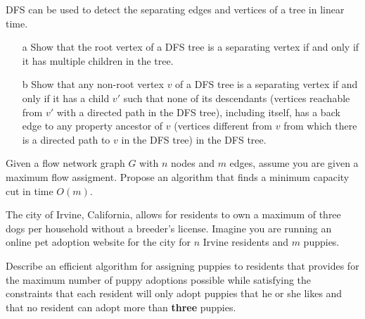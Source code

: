 \documentclass{common/cs157}
\begin{document}
\homeworkhandin

\begin{problem}{1}
DFS can be used to detect the separating edges and vertices of a tree in linear time.
\begin{itemize}
    \item[a] Show that the root vertex of a DFS tree is a separating vertex if and only if it has multiple children in the tree.
    \item[b] Show that any non-root vertex $v$ of a DFS tree is a separating vertex if and only if it has a child $v'$ such that none of its descendants (vertices reachable from $v'$ with a directed  path in the DFS tree), including itself, has a back edge to any property ancestor of $v$ (vertices different from $v$ from which there is a directed path to $v$ in the DFS tree) in the DFS tree.
\end{itemize}
\end{problem}
\newpage

\begin{problem}{2}
Given a flow network graph $G$ with $n$ nodes and $m$ edges, assume you are given a maximum flow assigment. Propose an algorithm that finds a minimum capacity cut in time $O(m)$.

\end{problem}
\newpage

\begin{problem}{3}
The city of Irvine, California, allows for residents to own a maximum of three
dogs per household without a breeder’s license. Imagine you are running an
online pet adoption website for the city for $n$ Irvine residents and $m$ puppies. 

Describe an efficient algorithm for assigning puppies to residents that provides for the maximum number of puppy adoptions possible while satisfying the constraints that each resident will only adopt puppies that he or she likes and that no resident can adopt more than \textbf{three} puppies.
\end{problem}
\end{document}
